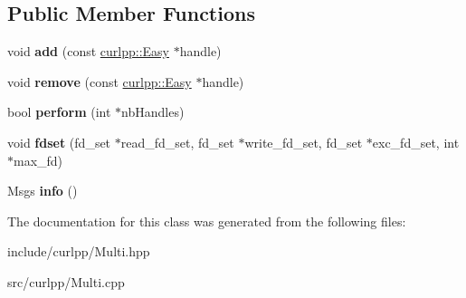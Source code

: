 \subsection*{Public Member Functions}
\begin{DoxyCompactItemize}
\item 
\hypertarget{classcurlpp_1_1Multi_aeb6841e84ac1ca5e187230aeb7cbb893}{void {\bfseries add} (const \hyperlink{classcurlpp_1_1Easy}{curlpp\-::\-Easy} $\ast$handle)}\label{classcurlpp_1_1Multi_aeb6841e84ac1ca5e187230aeb7cbb893}

\item 
\hypertarget{classcurlpp_1_1Multi_a8c347c1702fdc01792525bb2b2e96085}{void {\bfseries remove} (const \hyperlink{classcurlpp_1_1Easy}{curlpp\-::\-Easy} $\ast$handle)}\label{classcurlpp_1_1Multi_a8c347c1702fdc01792525bb2b2e96085}

\item 
\hypertarget{classcurlpp_1_1Multi_a251b34e45fc80aea969e419780bee347}{bool {\bfseries perform} (int $\ast$nb\-Handles)}\label{classcurlpp_1_1Multi_a251b34e45fc80aea969e419780bee347}

\item 
\hypertarget{classcurlpp_1_1Multi_aea1ff10dc6f8072141c39a29c54b789b}{void {\bfseries fdset} (fd\-\_\-set $\ast$read\-\_\-fd\-\_\-set, fd\-\_\-set $\ast$write\-\_\-fd\-\_\-set, fd\-\_\-set $\ast$exc\-\_\-fd\-\_\-set, int $\ast$max\-\_\-fd)}\label{classcurlpp_1_1Multi_aea1ff10dc6f8072141c39a29c54b789b}

\item 
\hypertarget{classcurlpp_1_1Multi_a1af2f92a9e7ffbb6e984bc6ccb98d49d}{Msgs {\bfseries info} ()}\label{classcurlpp_1_1Multi_a1af2f92a9e7ffbb6e984bc6ccb98d49d}

\end{DoxyCompactItemize}


The documentation for this class was generated from the following files\-:\begin{DoxyCompactItemize}
\item 
include/curlpp/Multi.\-hpp\item 
src/curlpp/Multi.\-cpp\end{DoxyCompactItemize}
